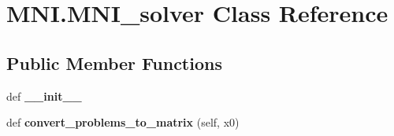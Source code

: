 \hypertarget{classMNI_1_1MNI__solver}{}\section{M\+N\+I.\+M\+N\+I\+\_\+solver Class Reference}
\label{classMNI_1_1MNI__solver}
\subsection*{Public Member Functions}
\begin{DoxyCompactItemize}
\item 
\mbox{\label{classMNI_1_1MNI__solver_ad94cf11748807e148b337c8171b9a050}} 
def {\bfseries \+\_\+\+\_\+init\+\_\+\+\_\+}
\item 
\mbox{\label{classMNI_1_1MNI__solver_a39a96969c32c10f2d815933e7d1584ac}} 
def {\bfseries convert\+\_\+problems\+\_\+to\+\_\+matrix} (self, x0)
\end{DoxyCompactItemize}
